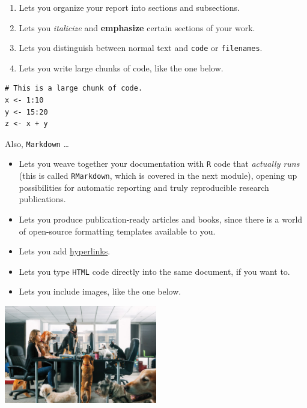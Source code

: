 \documentclass[]{book}
\providecommand{\tightlist}{%
  \setlength{\itemsep}{0pt}\setlength{\parskip}{0pt}}
\begin{document}
\begin{enumerate}
\def\labelenumi{\arabic{enumi}.}
\tightlist
\item
  Lets you organize your report into sections and subsections.\\
\item
  Lets you \emph{italicize} and \textbf{emphasize} certain sections of your work.
\item
  Lets you distinguish between normal text and \texttt{code} or \texttt{filenames}.
\item
  Lets you write large chunks of code, like the one below.
\end{enumerate}

\begin{verbatim}
# This is a large chunk of code. 
x <- 1:10
y <- 15:20
z <- x + y
\end{verbatim}

Also, \texttt{Markdown} \ldots{}

\begin{itemize}
\item
  Lets you weave together your documentation with \texttt{R} code that
  \emph{actually runs} (this is called \texttt{RMarkdown}, which is covered
  in the next module), opening up possibilities for automatic reporting
  and truly reproducible research publications.
\item
  Lets you produce publication-ready articles and books, since there is a
  world of open-source formatting templates available to you.
\item
  Lets you add \href{https://www.markdownguide.org/getting-started/}{hyperlinks}.
\item
  Lets you type \texttt{HTML} code directly into the same document,
  if you want to.
\item
  Lets you include images, like the one below.
\end{itemize}

\includegraphics[width=0.5\textwidth,height=\textheight]{img/markdown-dogs.jpeg}

~
\end{document}
